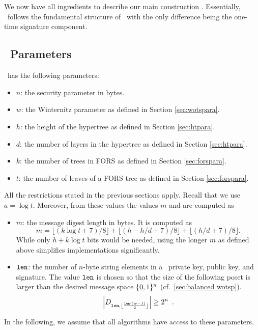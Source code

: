 \section{\SPHINCSA}
We now have all ingredients to describe our main construction \SPHINCSA. Essentially, \SPHINCSA\ follows the fundamental structure of \SPHINCSA\ with the only difference being the one-time signature component.

\subsection{\SPHINCSA\ Parameters}

\SPHINCSA\ has the following parameters:

\begin{itemize}

    \item $n$: the security parameter in bytes.

    \item $w$: the Winternitz parameter as defined in Section \ref{sec:wotspara}.
    
    \item $h$: the height of the hypertree as defined in Section \ref{sec:htpara}.
    
    \item $d$: the number of layers in the hypertree as defined in Section \ref{sec:htpara}.
    
    \item $k$: the number of trees in FORS as defined in Section \ref{sec:forspara}.
    
    \item $t$: the number of leaves of a FORS tree as defined in Section \ref{sec:forspara}.
    
\end{itemize}

All the restrictions stated in the previous sections apply. Recall that we use $a=\log t.$ Moreover, from these values the values $m$ and \len are computed as

\begin{itemize}
    \item $m$: the message digest length in bytes. It is computed as
    $$
    m=\lfloor(k\log t+7)/8\rfloor+\lfloor(h-h/d+7)/8\rfloor+\lfloor(h/d+7)/8\rfloor.
    $$
    While only $h+k\log t$ bits would be needed, using the longer $m$ as defined above simplifies implementations significantly.
    
    \item $\mathtt{len}$: the number of $n$-byte string elements in a \WOTSCS\ private key, public key, and signature. The value $\mathtt{len}$ is chosen so that the size of the following poset is larger than the desired message space $\{0,1\}^n$ (cf.~\cref{sec:balanced wotsp}).
    \[\left| D_{ \mathtt{len}, \lfloor \frac{\mathtt{len} \cdot (w-1)}{2} \rfloor } \right| \geq 2^n \enspace. \]

\end{itemize}
In the following, we assume that all algorithms have access to these parameters.

